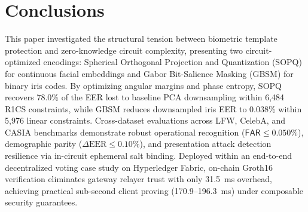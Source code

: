 \documentclass[10pt,letterpaper,journal]{IEEEtran}
\begin{document}
\section{Conclusions}
\label{sec:conclusions}
This paper investigated the structural tension between biometric template protection and zero-knowledge circuit complexity, presenting two circuit-optimized encodings: Spherical Orthogonal Projection and Quantization (SOPQ) for continuous facial embeddings and Gabor Bit-Salience Masking (GBSM) for binary iris codes. By optimizing angular margins and phase entropy, SOPQ recovers 78.0\% of the EER lost to baseline PCA downsampling within 6,484 R1CS constraints, while GBSM reduces downsampled iris EER to 0.038\% within 5,976 linear constraints. Cross-dataset evaluations across LFW, CelebA, and CASIA benchmarks demonstrate robust operational recognition ($\mathsf{FAR} \le 0.050\%$), demographic parity ($\Delta\text{EER} \le 0.10\%$), and presentation attack detection resilience via in-circuit ephemeral salt binding. Deployed within an end-to-end decentralized voting case study on Hyperledger Fabric, on-chain Groth16 verification eliminates gateway relayer trust with only 31.5~ms overhead, achieving practical sub-second client proving (170.9--196.3~ms) under composable security guarantees.

\begingroup
\footnotesize
\def\IEEEbibitemsep{-1.6pt plus 0.2pt minus 0.2pt}
\let\oldthebibliography\thebibliography
\let\endoldthebibliography\endthebibliography
\renewenvironment{thebibliography}[1]{%
  \begin{oldthebibliography}{#1}%
    \setlength{\itemsep}{-1.6pt plus 0.2pt minus 0.2pt}%
    \setlength{\parsep}{0pt}%
    \setlength{\parskip}{0pt}%
}{%
  \end{oldthebibliography}%
}


\endgroup
\end{document}
